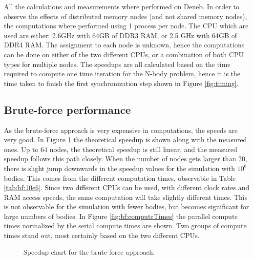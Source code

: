 All the calculations and measurements where performed on Deneb. In order to observe the effects of distributed memory nodes (and not shared memory nodes), the computations where performed using 1 process per node. The CPU which are used are either: 2.6GHz with 64GB of DDR3 RAM, or 2.5 GHz with 64GB of DDR4 RAM. The assignment to each node is unknown, hence the computations can be done on either of the two different CPUs, or a combination of both CPU types for multiple nodes. The speedups are all calculated based on the time required to compute one time iteration for the N-body problem, hence it is the time taken to finish the first synchronization step shown in Figure \ref{fig:timing}.\\
\subsection{Brute-force performance}
As the brute-force approach is very expensive in computations, the speeds are very good. In Figure \ref{fig:speedup:bf} the theoretical speedup is shown along with the measured ones. Up to 64 nodes, the theoretical speedup is still linear, and the measured speedup follows this path closely. When the number of nodes gets larger than 20, there is slight jump downwards in the speedup values for the simulation with $10^6$ bodies. This comes from the different computation times, observable in Table \ref{tab:bf:10e6}. Since two different CPUs can be used, with different clock rates and RAM access speeds, the same computation will take slightly different times. This is not observable for the simulation with fewer bodies, but becomes significant for large numbers of bodies. In Figure \ref{fig:bf:computeTimes} the parallel compute times normalized by the serial compute times are shown. Two groups of compute times stand out, most certainly based on the two different CPUs.\\

\begin{figure}
\centering

\caption{Speedup chart for the brute-force approach.}
\label{fig:speedup:bf}
\end{figure}

